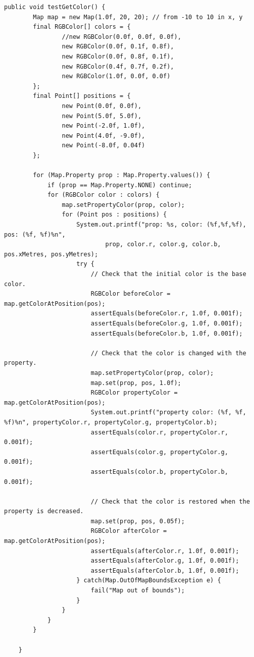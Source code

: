 \documentclass[12pt,a4paper]{article}
\begin{document}
     \begin{lstlisting}[caption=Map automated test suite 2, captionpos=b, label={lst:MapAutomatedTestSuite2}]
     public void testGetColor() {
        Map map = new Map(1.0f, 20, 20); // from -10 to 10 in x, y
        final RGBColor[] colors = {
                //new RGBColor(0.0f, 0.0f, 0.0f),
                new RGBColor(0.0f, 0.1f, 0.8f),
                new RGBColor(0.0f, 0.8f, 0.1f),
                new RGBColor(0.4f, 0.7f, 0.2f),
                new RGBColor(1.0f, 0.0f, 0.0f)
        };
        final Point[] positions = {
                new Point(0.0f, 0.0f),
                new Point(5.0f, 5.0f),
                new Point(-2.0f, 1.0f),
                new Point(4.0f, -9.0f),
                new Point(-8.0f, 0.04f)
        };
        
        for (Map.Property prop : Map.Property.values()) {
            if (prop == Map.Property.NONE) continue;
            for (RGBColor color : colors) {
                map.setPropertyColor(prop, color);
                for (Point pos : positions) {
                    System.out.printf("prop: %s, color: (%f,%f,%f), pos: (%f, %f)%n",
                            prop, color.r, color.g, color.b, pos.xMetres, pos.yMetres);
                    try {
                        // Check that the initial color is the base color.
                        RGBColor beforeColor = map.getColorAtPosition(pos);
                        assertEquals(beforeColor.r, 1.0f, 0.001f);
                        assertEquals(beforeColor.g, 1.0f, 0.001f);
                        assertEquals(beforeColor.b, 1.0f, 0.001f);
                        
                        // Check that the color is changed with the property.
                        map.setPropertyColor(prop, color);
                        map.set(prop, pos, 1.0f);
                        RGBColor propertyColor = map.getColorAtPosition(pos);
                        System.out.printf("property color: (%f, %f, %f)%n", propertyColor.r, propertyColor.g, propertyColor.b);
                        assertEquals(color.r, propertyColor.r, 0.001f);
                        assertEquals(color.g, propertyColor.g, 0.001f);
                        assertEquals(color.b, propertyColor.b, 0.001f);
                        
                        // Check that the color is restored when the property is decreased.
                        map.set(prop, pos, 0.05f);
                        RGBColor afterColor = map.getColorAtPosition(pos);
                        assertEquals(afterColor.r, 1.0f, 0.001f);
                        assertEquals(afterColor.g, 1.0f, 0.001f);
                        assertEquals(afterColor.b, 1.0f, 0.001f);
                    } catch(Map.OutOfMapBoundsException e) {
                        fail("Map out of bounds");
                    }
                }
            }
        }
        
    }
     \end{lstlisting}
     
\end{document}
